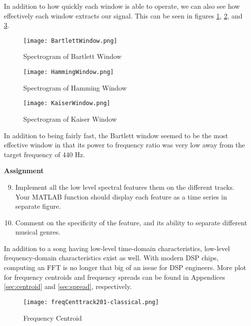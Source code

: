 \documentclass{article} %
\begin{document}


In addition to how quickly each window is able to operate, we can also see how effectively each window extracts our signal. This can be seen in figures \ref{fig:bartWindow},
\ref{fig:hamWindow}, and \ref{fig:kaiserWindow}.


\begin{figure}[H]
\centering
\texttt{[image: BartlettWindow.png]}
\caption{Spectrogram of Bartlett Window}
\label{fig:bartWindow}
\end{figure}


\begin{figure}[H]
\centering
\texttt{[image: HammingWindow.png]}
\caption{Spectrogram of Hamming Window}
\label{fig:hamWindow}
\end{figure}

\begin{figure}[H]
\centering
\texttt{[image: KaiserWindow.png]}
\caption{Spectrogram of Kaiser Window}
\label{fig:kaiserWindow}
\end{figure}

In addition to being fairly fast, the Bartlett window seemed to be the most effective window in that its power to frequency ratio was very low away from the target frequency of 440 Hz. 


\begin{framed}
\textbf{Assignment}
\begin{enumerate}
\setcounter{enumi}{8}
\item Implement all the low level spectral features them on the different tracks. Your MATLAB function should display each feature as a time series in separate figure. 
\item Comment on the specificity of the feature, and its ability to separate different musical genres. 
\end{enumerate}
\end{framed}

In addition to a song having low-level time-domain characteristics, low-level frequency-domain characteristics exist as well. With modern DSP chips, computing an FFT is no longer
that big of an issue for DSP engineers. More plot for frequency centroids and frequency spreads can be found in Appendices \ref{sec:centroid} and \ref{sec:spread}, respectively.

\begin{figure}[H]
\centering
\texttt{[image: freqCenttrack201-classical.png]}
\caption{Frequency Centroid}
\label{fig:cent201}
\end{figure}
\end{document}
